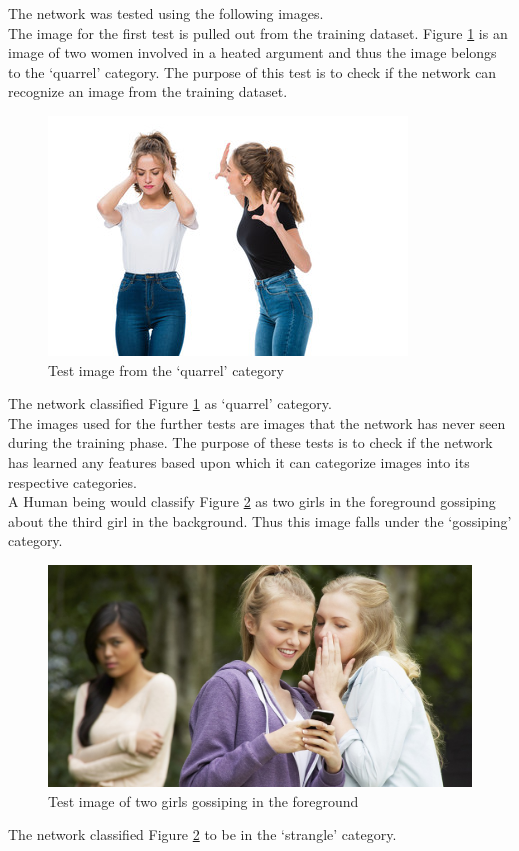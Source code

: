 \documentclass[12pt]{article}
\begin{document}
\noindent
The network was tested using the following images. \\

\noindent
The image for the first test is pulled out from the training dataset. Figure \ref{fig:quarrel} is an image of two women involved in a heated argument and thus the image belongs to the \lq{quarrel}\rq{} category. The purpose of this test is to check if the network can recognize an image from the training dataset. 
\begin{figure}[H]
\centering
  \includegraphics[width=.6\linewidth]{./Images/quarrel.jpg}
  \caption{Test image from the \lq{quarrel}\rq{} category}
  \label{fig:quarrel}
\end{figure}
The network classified Figure \ref{fig:quarrel} as \lq{quarrel}\rq{} category. \\

\noindent
The images used for the further tests are images that the network has never seen during the training phase. The purpose of these tests is to check if the network has learned any features based upon which it can categorize images into its respective categories. \\

A Human being would classify Figure \ref{fig:gossip1} as two girls in the foreground gossiping about the third girl in the background. Thus this image falls under the \lq{gossiping}\rq{} category. 
\begin{figure}[H]
\centering
  \includegraphics[width=.6\linewidth]{./Images/gossiping1.jpg}
  \caption{Test image of two girls gossiping in the foreground}
  \label{fig:gossip1}
\end{figure}
The network classified Figure \ref{fig:gossip1} to be in the  \lq{strangle}\rq{} category. \\
\end{document}
